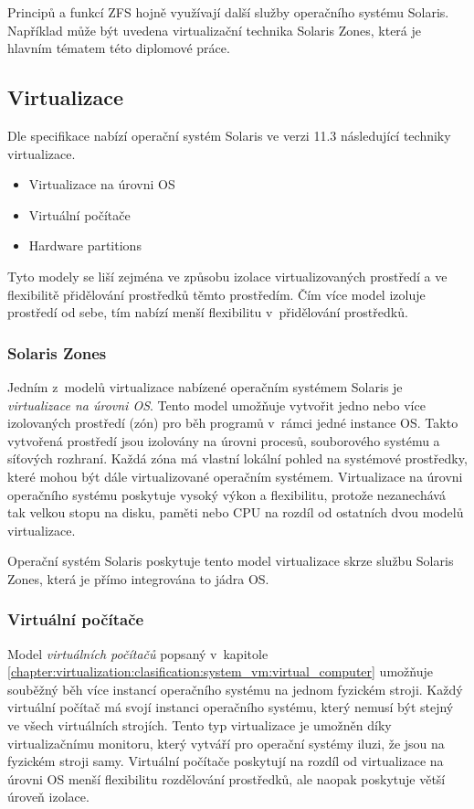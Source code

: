 Principů a funkcí ZFS hojně využívají další služby operačního systému Solaris. Například může být uvedena virtualizační technika
Solaris Zones, která je hlavním tématem této diplomové práce.
\subsection{Virtualizace}
\label{chapter:solaris:virtualization}
Dle specifikace \cite{oracle:solaris:virtualization} nabízí operační systém Solaris ve verzi 11.3 následující techniky virtualizace.
\begin{itemize}
 \item Virtualizace na úrovni OS
 \item Virtuální počítače
 \item Hardware partitions
\end{itemize}
Tyto modely se liší zejména ve způsobu izolace virtualizovaných prostředí a ve flexibilitě přidělování prostředků těmto
prostředím. Čím více model izoluje prostředí od sebe, tím nabízí menší flexibilitu v~přidělování prostředků.
\subsubsection{Solaris Zones}
\label{chapter:solaris:virtualization:szones}
Jedním z~modelů virtualizace nabízené operačním systémem Solaris je \textit{virtualizace na úrovni OS}. Tento model umožňuje
vytvořit jedno nebo více izolovaných prostředí (zón) pro běh programů v~rámci jedné instance OS. Takto vytvořená prostředí
jsou izolovány na úrovni procesů, souborového systému a síťových rozhraní. Každá zóna má vlastní lokální pohled na systémové
prostředky, které mohou být dále virtualizované operačním systémem. Virtualizace na úrovni operačního systému poskytuje vysoký
výkon a flexibilitu, protože nezanechává tak velkou stopu na disku, paměti nebo CPU na rozdíl od ostatních dvou modelů virtualizace. 

Operační systém Solaris poskytuje tento model virtualizace skrze službu Solaris Zones, která je přímo integrována to jádra OS.

\subsubsection{Virtuální počítače}
\label{chapter:solaris:virtualization:vm}
Model \textit{virtuálních počítačů} popsaný v~kapitole \ref{chapter:virtualization:clasification:system_vm:virtual_computer} 
umožňuje souběžný běh více instancí operačního systému na jednom fyzickém stroji. Každý virtuální počítač má svojí instanci
operačního systému, který nemusí být stejný ve všech virtuálních strojích. Tento typ virtualizace je umožněn díky virtualizačnímu
monitoru, který vytváří pro operační systémy iluzi, že jsou na fyzickém stroji samy. Virtuální počítače poskytují na rozdíl od
virtualizace na úrovni OS menší flexibilitu rozdělování prostředků, ale naopak poskytuje větší úroveň izolace.

